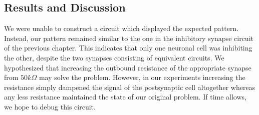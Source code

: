 \documentclass[12]{book}
\newcommand\0{\mathbf{0}}
\newcommand\<{\langle}
\renewcommand\>{\rangle}
\begin{document}
\subsection{Results and Discussion}

We were unable to construct a circuit which displayed the expected pattern. Instead, our pattern remained similar to the one in the inhibitory synapse circuit of the previous chapter. This indicates that only one neuronal cell was inhibiting the other, despite the two synapses consisting of equivalent circuits. We hypothesized that increasing the outbound resistance of the appropriate synapse from $50k\Omega$ may solve the problem. However, in our experiments increasing the resistance simply dampened the signal of the postsynaptic cell altogether whereas any less resistance maintained the state of our original problem. If time allows, we hope to debug this circuit.



\nocite{*}
\end{document}
